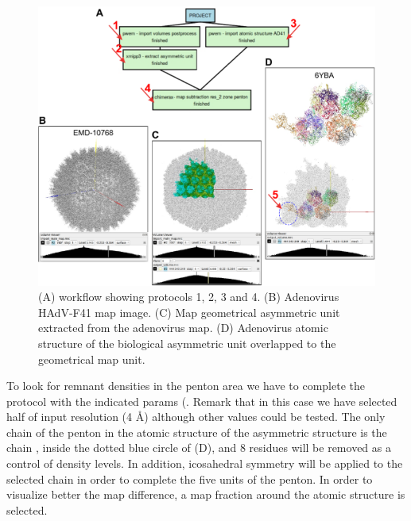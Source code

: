 \begin{itemize}
                            \begin{figure}[H]
                            \centering 
                            \captionsetup{width=.9\linewidth} 
                            \includegraphics[width=.9\textwidth]{Images_appendix/Fig310.pdf}
                            \caption{(A) \scipion workflow showing protocols 1, 2, 3 and 4. (B) Adenovirus HAdV-F41 map image. (C) Map geometrical asymmetric unit extracted from the adenovirus map. (D) Adenovirus atomic structure of the biological asymmetric unit overlapped to the geometrical map unit. }  
                            \label{fig:app_usecase_mapsubtract_1}
                            \end{figure}
                To look for remnant densities in the penton area we have to complete the  protocol with the indicated params (. Remark that in this case we have selected half of input  resolution (4 \AA) although other values could be tested. The only chain of the penton in the atomic structure of the asymmetric structure is the chain , inside the dotted blue circle of  (D), and 8 residues will be removed as a control of density levels. In addition, icosahedral  symmetry will be applied to the selected chain in order to complete the five units of the penton. In order to visualize better the map difference, a map fraction around the atomic structure is selected.
                            

\end{itemize}
